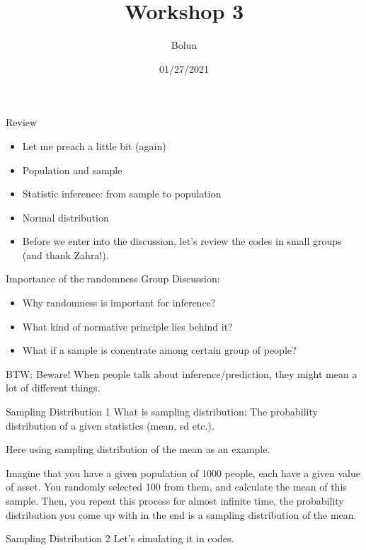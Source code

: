 \documentclass[
  ignorenonframetext,
]{beamer}
\title{Workshop 3}
\author{Bolun}
\date{01/27/2021}
\providecommand{\tightlist}{%
  \setlength{\itemsep}{0pt}\setlength{\parskip}{0pt}}
\begin{document}
\frame{\titlepage}

\begin{frame}{Review}
\protect\hypertarget{review}{}
\begin{itemize}
\item
  Let me preach a little bit (again)
\item
  Population and sample
\item
  Statistic inference: from sample to population
\item
  Normal distribution
\item
  Before we enter into the discussion, let's review the codes in small
  groups (and thank Zahra!).
\end{itemize}
\end{frame}

\begin{frame}{Importance of the randomness}
\protect\hypertarget{importance-of-the-randomness}{}
Group Discussion:

\begin{itemize}
\tightlist
\item
  Why randomness is important for inference?
\item
  What kind of normative principle lies behind it?
\item
  What if a sample is conentrate among certain group of people?
\end{itemize}

BTW: Beware! When people talk about inference/prediction, they might
mean a lot of different things.
\end{frame}

\begin{frame}{Sampling Distribution 1}
\protect\hypertarget{sampling-distribution-1}{}
What is sampling distribution: The probability distribution of a given
statistics (mean, sd etc.).

Here using sampling distribution of the mean as an example.

Imagine that you have a given population of 1000 people, each have a
given value of asset. You randomly selected 100 from them, and calculate
the mean of this sample. Then, you repeat this process for almost
infinite time, the probability distribution you come up with in the end
is a sampling distribution of the mean.
\end{frame}

\begin{frame}{Sampling Distribution 2}
\protect\hypertarget{sampling-distribution-2}{}
Let's simulating it in codes.
\end{frame}
\end{document}
